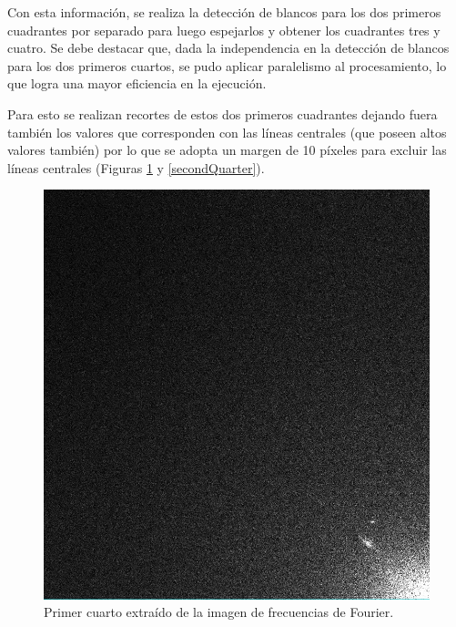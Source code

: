 \documentclass[10pt,a4paper, twoside]{report}
\begin{document}
Con esta información, se realiza la detección de blancos para los dos primeros cuadrantes por separado para luego espejarlos y obtener los cuadrantes tres y cuatro. Se debe destacar que, dada la independencia en la detección de blancos para los dos primeros cuartos, se pudo aplicar paralelismo al procesamiento, lo que logra una mayor eficiencia en la ejecución.

Para esto se realizan recortes de estos dos primeros cuadrantes dejando fuera también los valores que corresponden con las líneas centrales (que poseen altos valores también) por lo que se adopta un margen de 10 píxeles para excluir las líneas centrales (Figuras \ref{firstQuarter} y \ref{secondQuarter}).

\begin{figure}[!htb]
   \begin{minipage}{0.48\textwidth}
			\centering
			\includegraphics[width=1.0\linewidth]{imagenes/fstQuarterFourier.jpg}
			\caption{Primer cuarto extraído de la imagen de frecuencias de Fourier.}
			\label{firstQuarter}
   \end{minipage}\hfill
   \begin {minipage}{0.48\textwidth}
			\centering

\end{minipage}
\end{figure}
\end{document}
